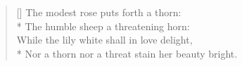 \documentclass[MAIN]{subfiles}
\begin{document}
\settowidth{\versewidth}{Nor a thorn nor a threat stain her beauty bright.}
\begin{verse}[\versewidth]
The modest rose puts forth a thorn:\\*
The humble sheep a threatening horn:\\
While the lily white shall in love delight,\\*
Nor a thorn nor a threat stain her beauty bright.
\end{verse}
\end{document}
